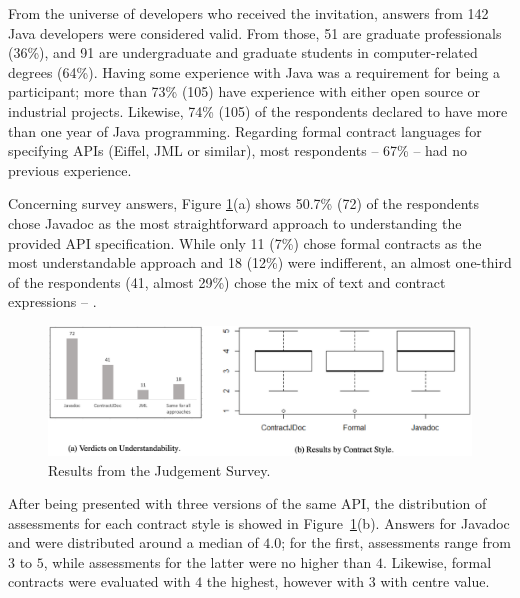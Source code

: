 From the universe of developers who received the invitation, answers from 142 Java developers were considered valid.
From those, 51 are graduate professionals (36\%), and 91 are undergraduate and graduate students in computer-related degrees (64\%).
Having some experience with Java was a requirement for being a participant; more than 73\% (105) have experience with either open source or industrial projects. Likewise, 74\% (105) of the respondents declared to have more than one year of Java programming.
Regarding formal contract languages for specifying APIs (Eiffel, JML or similar), most respondents -- 67\% -- had no previous experience. 


Concerning survey answers, Figure \ref{fig:survey}(a) shows 50.7\% (72) of the respondents chose Javadoc as the most straightforward approach to understanding the provided API specification. 
While only 11 (7\%) chose formal contracts as the most understandable approach and 18 (12\%) were indifferent, an almost one-third of the respondents (41, almost 29\%) chose the mix of text and contract expressions -- \contractjdoc{}.


\begin{figure}
\centering
\includegraphics[width=0.8\linewidth]{figs/survAll.png}
\caption{Results from the Judgement Survey.}
\label{fig:survey}
\end{figure}





After being presented with three versions of the same API, the distribution of assessments for each contract style is showed in Figure~\ref{fig:survey}(b).
Answers for Javadoc and \contractjdoc{} were distributed around a median of $4.0$; for the first, assessments range from $3$ to $5$, while assessments for the latter were no higher than $4$.
Likewise, formal contracts were evaluated with $4$ the highest, however with $3$ with centre value. 

\begin{figure}
\centering
\end{figure}


